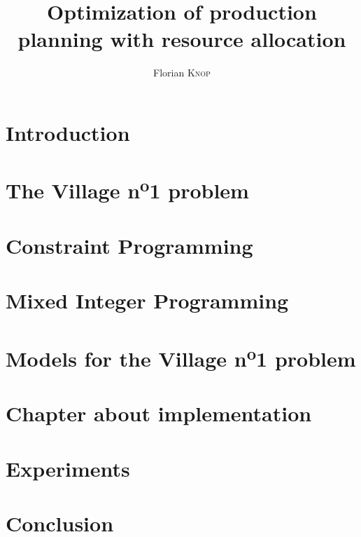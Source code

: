 \documentclass{template/EPL-master-thesis-covers-EN}
\title{Optimization of production planning with resource allocation}
\author{Florian \textsc{Knop}}
\begin{document}
  
  \maketitle

  \tableofcontents

  \chapter{Introduction}
  

  \chapter{The Village n\textsuperscript{o}1 problem}
  


  \chapter{Constraint Programming}

  \chapter{Mixed Integer Programming}
  
  \chapter{Models for the Village n\textsuperscript{o}1 problem}

  
  
  

  \chapter{Chapter about implementation}

  \chapter{Experiments}

  \chapter{Conclusion}

  \backcoverpage
\end{document}

